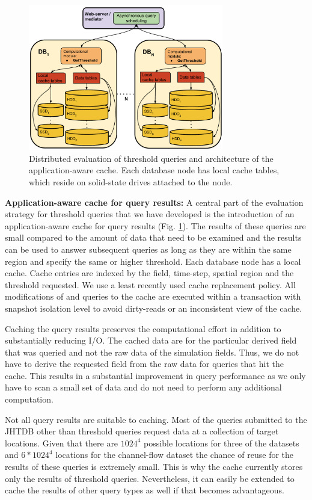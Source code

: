 \documentclass{sig-alternate}
\begin{document}
\begin{figure}
\centering
\includegraphics[width=3.35in]{Figures/cache_diagram.pdf}
\caption{Distributed evaluation of threshold queries and architecture of the application-aware cache. 
Each database node has local cache tables, which reside on solid-state drives attached to the node.}
\label{fig:cache_diagram}
\end{figure}

{\bf Application-aware cache for query results:} A central part of the evaluation strategy for threshold queries that we have developed is the 
introduction of an application-aware cache
for query results (Fig. \ref{fig:cache_diagram}). The results of these queries are small compared to the amount of data that need to be examined and the
results can be used to answer subsequent queries as long as they are within the same region and specify the same or higher threshold. Each database node 
has a local cache. Cache entries are indexed by the field, time-step, spatial region and the threshold requested. We use a least recently
used cache replacement policy. All modifications of and queries to the cache are executed within a transaction with snapshot isolation level to
avoid dirty-reads or an inconsistent view of the cache. 

Caching the query results
preserves the computational effort in addition to substantially reducing I/O. The cached data are for the particular derived field that was queried
and not the raw data of the simulation fields.
Thus, we do not have to derive the requested field from the raw data for 
queries that hit the cache. This results in a substantial improvement in query performance as we only have to scan
a small set of data and do not need to perform any additional computation.

Not all query results are suitable to caching. Most of the queries submitted to the JHTDB other than threshold queries request data at a collection of target
locations. Given that there are $1024^4$ possible locations for three of the datasets and $6*1024^4$ locations for the channel-flow dataset the chance of
reuse for the results of these queries is extremely small. This is why the cache currently stores only the results of threshold queries. Nevertheless, it can 
easily be extended to cache the results of other query types as well if that becomes advantageous.
\end{document}
